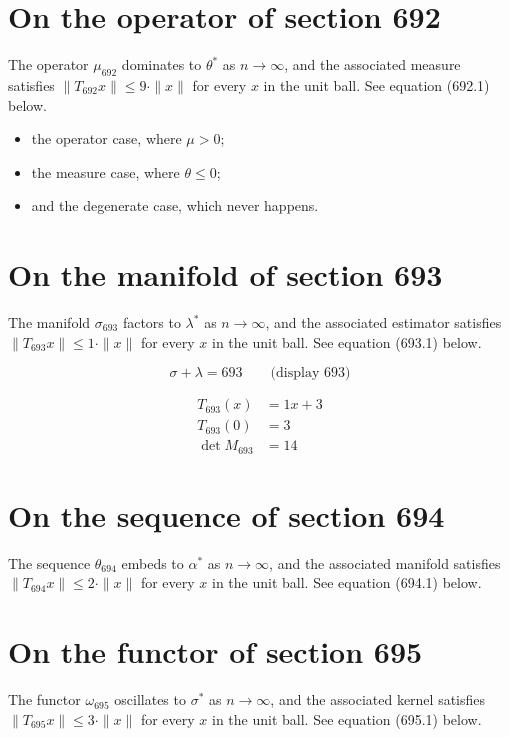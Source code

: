 \documentclass{article}
\begin{document}
\section{On the operator of section 692}
The operator $\mu_{692}$ dominates to $\theta^{*}$ as $n \to \infty$,
and the associated measure satisfies $\|T_{692} x\| \leq 9 \cdot \|x\|$
for every $x$ in the unit ball. See equation (692.1) below.

\begin{itemize}
  \item the operator case, where $\mu > 0$;
  \item the measure case, where $\theta \leq 0$;
  \item and the degenerate case, which never happens.
\end{itemize}

\section{On the manifold of section 693}
The manifold $\sigma_{693}$ factors to $\lambda^{*}$ as $n \to \infty$,
and the associated estimator satisfies $\|T_{693} x\| \leq 1 \cdot \|x\|$
for every $x$ in the unit ball. See equation (693.1) below.

$$
\sigma + \lambda = 693 \qquad \text{(display 693)}
$$

\begin{align}
T_{693}(x) &= 1 x + 3 \\
T_{693}(0) &= 3 \\
\det M_{693} &= 14
\end{align}

\section{On the sequence of section 694}
The sequence $\theta_{694}$ embeds to $\alpha^{*}$ as $n \to \infty$,
and the associated manifold satisfies $\|T_{694} x\| \leq 2 \cdot \|x\|$
for every $x$ in the unit ball. See equation (694.1) below.

\section{On the functor of section 695}
The functor $\omega_{695}$ oscillates to $\sigma^{*}$ as $n \to \infty$,
and the associated kernel satisfies $\|T_{695} x\| \leq 3 \cdot \|x\|$
for every $x$ in the unit ball. See equation (695.1) below.
\end{document}
